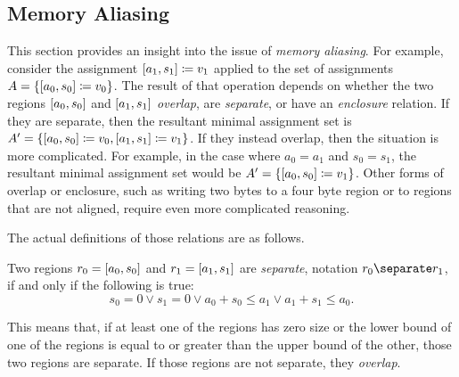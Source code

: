
\subsection{Memory Aliasing}\label{memory_aliasing}
This section provides an insight into the issue of \emph{memory aliasing}.%
For example, consider the assignment $[a_1,s_1]\coloneqq v_1$
applied to the set of assignments $A=\{[a_0,s_0]\coloneqq v_0\}$.
The result of that operation
depends on whether the two regions $[a_0,s_0]$ and $[a_1,s_1]$
\emph{overlap}, are \emph{separate}, or have an \emph{enclosure} relation.%
%
%
If they are separate, then the resultant minimal assignment set is
$A'=\{[a_0,s_0]\coloneqq v_0,[a_1,s_1]\coloneqq v_1\}$.
If they instead overlap, then the situation is more complicated.
For example, in the case where $a_0=a_1$ and $s_0=s_1$,
the resultant minimal assignment set would be $A'=\{[a_0,s_0]\coloneqq v_1\}$.
Other forms of overlap or enclosure, such as writing two bytes to a four byte region
or to regions that are not aligned, require even more complicated reasoning.

The actual definitions of those relations are as follows.
\begin{definition}[Separation]\label{def:sep}
  Two regions $r_0=[a_0,s_0]$ and $r_1=[a_1,s_1]$ are \emph{separate},%
  notation $r_0\separate r_1$, if and only if the following is true:
  \begin{equation*}
    s_0=0\vee s_1=0\vee a_0+s_0\leq a_1\vee a_1+s_1\leq a_0.
  \end{equation*}
\end{definition}
This means that, if at least one of the regions has zero size
or the lower bound of one of the regions is equal to or greater than
the upper bound of the other, those two regions are separate.
If those regions are not separate, they \emph{overlap}.

